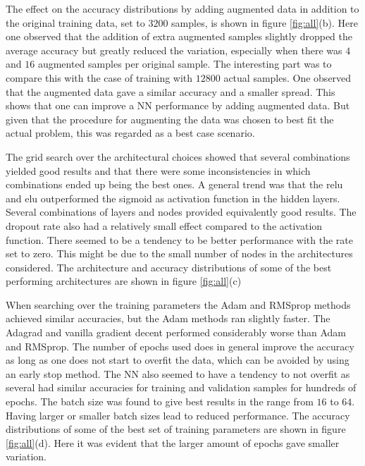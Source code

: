 \documentclass[prl,twocolumn]{revtex4-1}
\begin{document}
The effect on the accuracy distributions by adding augmented data in addition to the original training data, set to $3200$ samples, is shown in figure \ref{fig:all}(b). Here one observed that the addition of extra augmented samples slightly dropped the average accuracy but greatly reduced the variation, especially when there was $4$ and $16$ augmented samples per original sample. The interesting part was to compare this with the case of training with $12800$ actual samples. One observed that the augmented data gave a similar accuracy and a smaller spread. This shows that one can improve a NN performance by adding augmented data. But given that the procedure for augmenting the data was chosen to best fit the actual problem, this was regarded as a best case scenario. 

The grid search over the architectural choices showed that several combinations yielded good results and that there were some inconsistencies in which combinations ended up being the best ones. A general trend was that the relu and elu outperformed the sigmoid as activation function in the hidden layers. Several combinations of layers and nodes provided equivalently good results. The dropout rate also had a relatively small effect compared to the activation function. There seemed to be a tendency to be better performance with the rate set to zero. This might be due to the small number of nodes in the architectures considered. The architecture and accuracy distributions of some of the best performing architectures are shown in figure \ref{fig:all}(c)

When searching over the training parameters the Adam and RMSprop methods achieved similar accuracies, but the Adam methods ran slightly faster. The Adagrad and vanilla gradient decent performed considerably worse than Adam and RMSprop. The number of epochs used does in general improve the accuracy as long as one does not start to overfit the data, which can be avoided by using an early stop method. The NN also seemed to have a tendency to not overfit as several had similar accuracies for training and validation samples for hundreds of epochs. The batch size was found to give best results in the range from $16$ to $64$. Having larger or smaller batch sizes lead to reduced performance. The accuracy distributions of some of the best set of training parameters are shown in figure \ref{fig:all}(d). Here it was evident that the larger amount of epochs gave smaller variation. 
\end{document}
